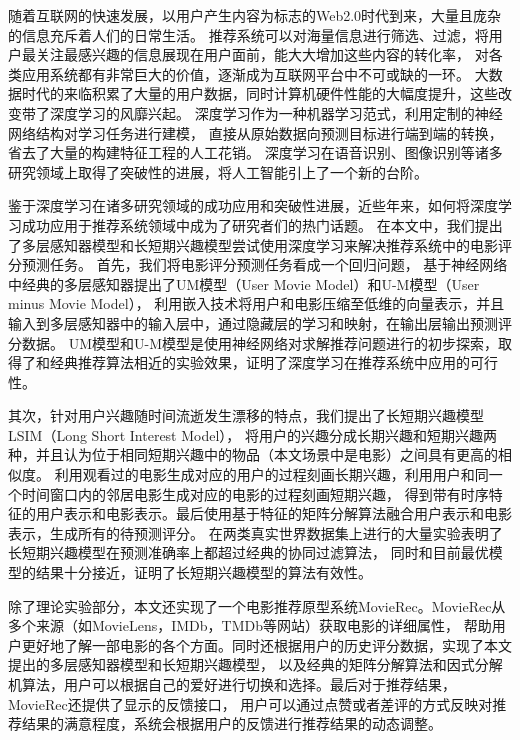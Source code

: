 \begin{cabstract}
随着互联网的快速发展，以用户产生内容为标志的Web2.0时代到来，大量且庞杂的信息充斥着人们的日常生活。
推荐系统可以对海量信息进行筛选、过滤，将用户最关注最感兴趣的信息展现在用户面前，能大大增加这些内容的转化率，
对各类应用系统都有非常巨大的价值，逐渐成为互联网平台中不可或缺的一环。
大数据时代的来临积累了大量的用户数据，同时计算机硬件性能的大幅度提升，这些改变带了深度学习的风靡兴起。
深度学习作为一种机器学习范式，利用定制的神经网络结构对学习任务进行建模，
直接从原始数据向预测目标进行端到端的转换，省去了大量的构建特征工程的人工花销。
深度学习在语音识别、图像识别等诸多研究领域上取得了突破性的进展，将人工智能引上了一个新的台阶。

鉴于深度学习在诸多研究领域的成功应用和突破性进展，近些年来，如何将深度学习成功应用于推荐系统领域中成为了研究者们的热门话题。
在本文中，我们提出了多层感知器模型和长短期兴趣模型尝试使用深度学习来解决推荐系统中的电影评分预测任务。
首先，我们将电影评分预测任务看成一个回归问题，
基于神经网络中经典的多层感知器提出了UM模型（User Movie Model）和U-M模型（User minus Movie Model），
利用嵌入技术将用户和电影压缩至低维的向量表示，并且输入到多层感知器中的输入层中，通过隐藏层的学习和映射，在输出层输出预测评分数据。
UM模型和U-M模型是使用神经网络对求解推荐问题进行的初步探索，取得了和经典推荐算法相近的实验效果，证明了深度学习在推荐系统中应用的可行性。

其次，针对用户兴趣随时间流逝发生漂移的特点，我们提出了长短期兴趣模型LSIM（Long Short Interest Model），
将用户的兴趣分成长期兴趣和短期兴趣两种，并且认为位于相同短期兴趣中的物品（本文场景中是电影）之间具有更高的相似度。
利用观看过的电影生成对应的用户的过程刻画长期兴趣，利用用户和同一个时间窗口内的邻居电影生成对应的电影的过程刻画短期兴趣，
得到带有时序特征的用户表示和电影表示。最后使用基于特征的矩阵分解算法融合用户表示和电影表示，生成所有的待预测评分。
在两类真实世界数据集上进行的大量实验表明了长短期兴趣模型在预测准确率上都超过经典的协同过滤算法，
同时和目前最优模型的结果十分接近，证明了长短期兴趣模型的算法有效性。

除了理论实验部分，本文还实现了一个电影推荐原型系统MovieRec。MovieRec从多个来源（如MovieLens，IMDb，TMDb等网站）获取电影的详细属性，
帮助用户更好地了解一部电影的各个方面。同时还根据用户的历史评分数据，实现了本文提出的多层感知器模型和长短期兴趣模型，
以及经典的矩阵分解算法和因式分解机算法，用户可以根据自己的爱好进行切换和选择。最后对于推荐结果，MovieRec还提供了显示的反馈接口，
用户可以通过点赞或者差评的方式反映对推荐结果的满意程度，系统会根据用户的反馈进行推荐结果的动态调整。
\end{cabstract}

